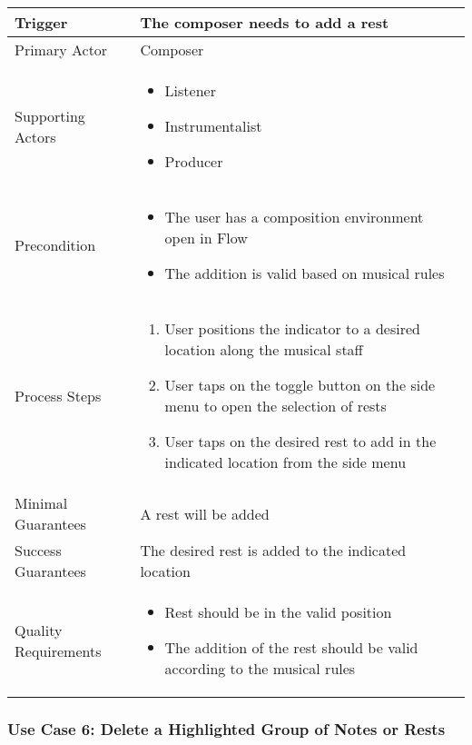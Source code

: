 \begin{tabularx}{\textwidth}{|X|X|}
\hline
Trigger &
The composer needs to add a rest \\
\hline
Primary Actor &
Composer \\
\hline
Supporting Actors & 
\begin{itemize}
\item Listener
\item Instrumentalist
\item Producer
\end{itemize} \\
\hline
Precondition & 
\begin{itemize}
\item The user has a composition environment open in Flow
\item The addition is valid based on musical rules
\end{itemize} \\
\hline
Process Steps & 
\begin{enumerate}
\item User positions the indicator to a desired location along the musical staff
\item User taps on the toggle button on the side menu to open the selection of rests
\item User taps on the desired rest to add in the indicated location from the side menu
\end{enumerate} \\
\hline
Minimal Guarantees & 
A rest will be added \\
\hline
Success Guarantees & 
The desired rest is added to the indicated location \\
\hline
Quality Requirements & 
\begin{itemize}
\item Rest should be in the valid position
\item The addition of the rest should be valid according to the musical rules
\end{itemize} \\ 
\hline
\end{tabularx}

\subsubsection{Use Case 6: Delete a Highlighted Group of Notes or Rests}

